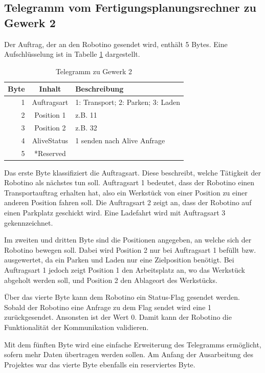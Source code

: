 \subsection{Telegramm vom Fertigungsplanungsrechner zu Gewerk 2}

Der Auftrag, der an den Robotino gesendet wird, enthält 5 Bytes. Eine Aufschlüsselung ist in Tabelle \ref{tab:TelegrammZuG2} dargestellt. 

\begin{table}[!ht]
	\centering
	\begin{tabular}{|r|c|l|}
		\hline
		Byte & Inhalt	&	Beschreibung \\
		\hline
			1  & Auftragsart & 1: Transport; 2: Parken; 3: Laden  \\
			2  & Position 1  & z.B. 11 \\
			3  & Position 2  & z.B. 32 \\
		  4  & AliveStatus & 1 senden nach Alive Anfrage \\
		  5  & *Reserved   &  \\
		\hline
	\end{tabular}
	\caption{Telegramm zu Gewerk 2}
	\label{tab:TelegrammZuG2}
\end{table}

Das erste Byte klassifiziert die Auftragsart. Diese beschreibt, welche Tätigkeit der Robotino als nächstes tun soll. Auftragsart 1 bedeutet, dass der Robotino einen Transportauftrag erhalten hat, also ein Werkstück von einer Position zu einer anderen Position fahren soll. Die Auftragsart 2 zeigt an, dass der Robotino auf einen Parkplatz geschickt wird. Eine Ladefahrt wird mit Auftragsart 3 gekennzeichnet. 

Im zweiten und dritten Byte sind die Positionen angegeben, an welche sich der Robotino bewegen soll. Dabei wird Position 2 nur bei Auftragsart 1 befüllt bzw. ausgewertet, da ein Parken und Laden nur eine Zielposition benötigt. Bei Auftragsart 1 jedoch zeigt Position 1 den Arbeitsplatz an, wo das Werkstück abgeholt werden soll, und Position 2 den Ablageort des Werkstücks. 

Über das vierte Byte kann dem Robotino ein Status-Flag gesendet werden. Sobald der Robotino eine Anfrage zu dem Flag sendet wird eine 1 zurückgesendet. Ansonsten ist der Wert 0. Damit kann der Robotino die Funktionalität der Kommunikation validieren.

Mit dem fünften Byte wird eine einfache Erweiterung des Telegramms ermöglicht, sofern mehr Daten übertragen werden sollen. Am Anfang der Ausarbeitung des Projektes war das vierte Byte ebenfalls ein reserviertes Byte. 

